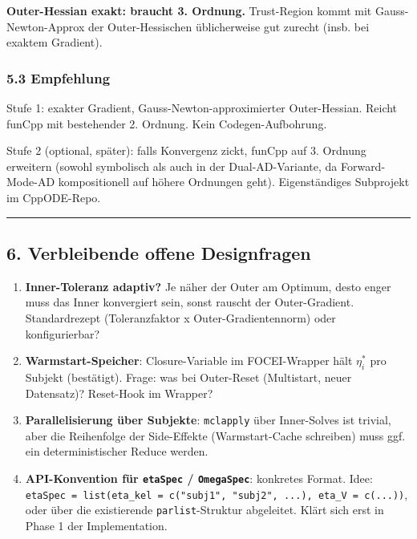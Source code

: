 \documentclass[
]{article}
\begin{document}
\textbf{Outer-Hessian exakt: braucht 3. Ordnung.} Trust-Region kommt mit
Gauss-Newton-Approx der Outer-Hessischen üblicherweise gut zurecht
(insb. bei exaktem Gradient).

\subsubsection{5.3 Empfehlung}\label{empfehlung-1}

Stufe 1: exakter Gradient, Gauss-Newton-approximierter Outer-Hessian.
Reicht funCpp mit bestehender 2. Ordnung. Kein Codegen-Aufbohrung.

Stufe 2 (optional, später): falls Konvergenz zickt, funCpp auf 3.
Ordnung erweitern (sowohl symbolisch als auch in der Dual-AD-Variante,
da Forward-Mode-AD kompositionell auf höhere Ordnungen geht).
Eigenständiges Subprojekt im CppODE-Repo.

\begin{center}\rule{0.5\linewidth}{0.5pt}\end{center}

\subsection{6. Verbleibende offene
Designfragen}\label{verbleibende-offene-designfragen}

\begin{enumerate}
\def\labelenumi{\arabic{enumi}.}
\item
  \textbf{Inner-Toleranz adaptiv?} Je näher der Outer am Optimum, desto
  enger muss das Inner konvergiert sein, sonst rauscht der
  Outer-Gradient. Standardrezept (Toleranzfaktor x Outer-Gradientennorm)
  oder konfigurierbar?
\item
  \textbf{Warmstart-Speicher}: Closure-Variable im FOCEI-Wrapper hält
  \(\eta_i^*\) pro Subjekt (bestätigt). Frage: was bei Outer-Reset
  (Multistart, neuer Datensatz)? Reset-Hook im Wrapper?
\item
  \textbf{Parallelisierung über Subjekte}: \texttt{mclapply} über
  Inner-Solves ist trivial, aber die Reihenfolge der Side-Effekte
  (Warmstart-Cache schreiben) muss ggf. ein deterministischer Reduce
  werden.
\item
  \textbf{API-Konvention für \texttt{etaSpec} / \texttt{OmegaSpec}}:
  konkretes Format. Idee:
  \texttt{etaSpec\ =\ list(eta\_kel\ =\ c("subj1",\ "subj2",\ ...),\ eta\_V\ =\ c(...))},
  oder über die existierende \texttt{parlist}-Struktur abgeleitet. Klärt
  sich erst in Phase 1 der Implementation.
\end{enumerate}
\end{document}
